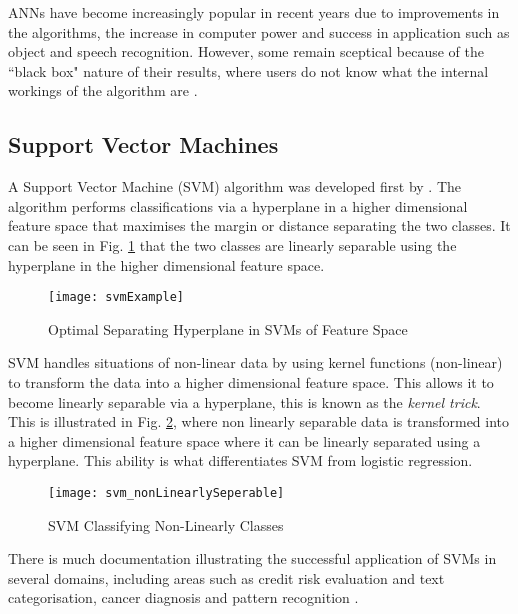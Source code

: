 ANNs have become increasingly popular in recent years due to improvements in the algorithms, the increase in computer power and success in application such as object and speech recognition. However, some remain sceptical because of the ``black box" nature of their results, where users do not know what the internal workings of the algorithm are  \citep{kaastra_forecasting_1995}. 



\subsection{Support Vector Machines} \label{SVM}
A Support Vector Machine (SVM) algorithm was developed first by \cite{vapnik_nature_1995}. The algorithm performs classifications via a hyperplane in a higher dimensional feature space that maximises the margin or distance separating the two classes. It can be seen in Fig. \ref{fig:svmExample} that the two classes are linearly separable using the hyperplane in the higher dimensional feature space. 

\begin{figure}[H]
	\texttt{[image: svmExample]}
	\caption{Optimal Separating Hyperplane in SVMs of Feature Space \\
		\cite[Source:][]{li_adaptive_2011}
	}
	\label{fig:svmExample}
\end{figure}

SVM handles situations of non-linear data by using kernel functions (non-linear) to transform the data into a higher dimensional feature space. This allows it to become linearly separable via a hyperplane, this is known as the \textit{kernel trick}. This is illustrated in Fig. \ref{fig:svm_nonLinearlySeperable}, where non linearly separable data is transformed into a higher dimensional feature space where it can be linearly separated using a hyperplane. This ability is what differentiates SVM from logistic regression.

\begin{figure}[H]
	\texttt{[image: svm\_nonLinearlySeperable]}
	\caption{SVM Classifying Non-Linearly Classes \\
		\cite[Source:][]{burges_tutorial_1998}
	}
	\label{fig:svm_nonLinearlySeperable}
\end{figure}

There is much documentation illustrating the successful application of SVMs in several domains, including areas such as credit risk evaluation \citep{van_gestel_credit_2009} and text categorisation, cancer diagnosis and pattern recognition \citep{shin_application_2005}.


